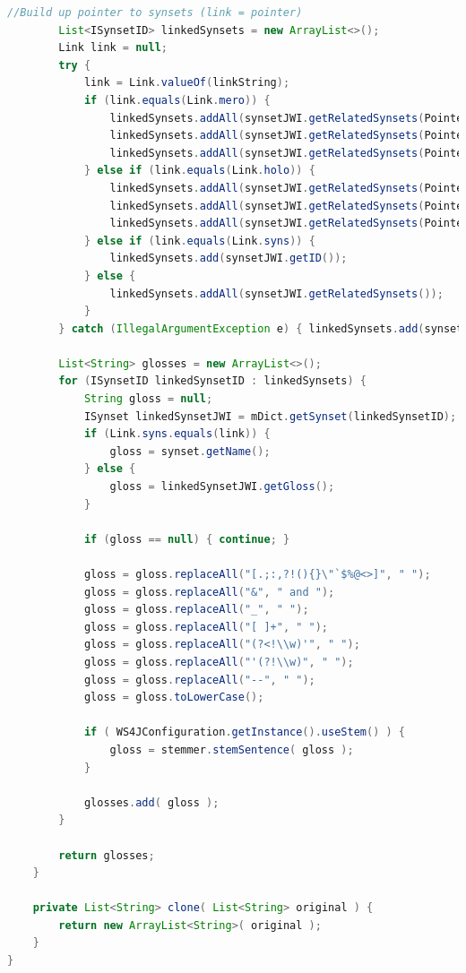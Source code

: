 \documentclass[12pt]{article}
\begin{document}
\begin{lstlisting}[language=Java]
        //Build up pointer to synsets (link = pointer)
        List<ISynsetID> linkedSynsets = new ArrayList<>();
        Link link = null;
        try {
            link = Link.valueOf(linkString);
            if (link.equals(Link.mero)) {
                linkedSynsets.addAll(synsetJWI.getRelatedSynsets(Pointer.MERONYM_MEMBER));
                linkedSynsets.addAll(synsetJWI.getRelatedSynsets(Pointer.MERONYM_SUBSTANCE));
                linkedSynsets.addAll(synsetJWI.getRelatedSynsets(Pointer.MERONYM_PART));
            } else if (link.equals(Link.holo)) {
                linkedSynsets.addAll(synsetJWI.getRelatedSynsets(Pointer.HOLONYM_MEMBER));
                linkedSynsets.addAll(synsetJWI.getRelatedSynsets(Pointer.HOLONYM_SUBSTANCE));
                linkedSynsets.addAll(synsetJWI.getRelatedSynsets(Pointer.HOLONYM_PART));
            } else if (link.equals(Link.syns)) {
                linkedSynsets.add(synsetJWI.getID());
            } else {
                linkedSynsets.addAll(synsetJWI.getRelatedSynsets());
            }
        } catch (IllegalArgumentException e) { linkedSynsets.add(synsetJWI.getID()); }

        List<String> glosses = new ArrayList<>();
        for (ISynsetID linkedSynsetID : linkedSynsets) {
            String gloss = null;
            ISynset linkedSynsetJWI = mDict.getSynset(linkedSynsetID);
            if (Link.syns.equals(link)) {
                gloss = synset.getName();
            } else {
                gloss = linkedSynsetJWI.getGloss();
            }

            if (gloss == null) { continue; }

            gloss = gloss.replaceAll("[.;:,?!(){}\"`$%@<>]", " ");
            gloss = gloss.replaceAll("&", " and ");
            gloss = gloss.replaceAll("_", " ");
            gloss = gloss.replaceAll("[ ]+", " ");
            gloss = gloss.replaceAll("(?<!\\w)'", " ");
            gloss = gloss.replaceAll("'(?!\\w)", " ");
            gloss = gloss.replaceAll("--", " ");
            gloss = gloss.toLowerCase();

            if ( WS4JConfiguration.getInstance().useStem() ) {
                gloss = stemmer.stemSentence( gloss );
            }

            glosses.add( gloss );
        }
      
        return glosses;
    }

    private List<String> clone( List<String> original ) {
        return new ArrayList<String>( original );
    }
}
\end{lstlisting}
\end{document}
